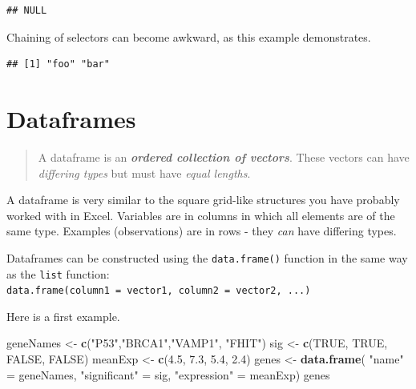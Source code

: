 \documentclass[]{book}
\newenvironment{Shaded}{\begin{snugshade}}{\end{snugshade}}
\newcommand{\CommentTok}[1]{\textcolor[rgb]{0.56,0.35,0.01}{\textit{#1}}}
\newcommand{\DecValTok}[1]{\textcolor[rgb]{0.00,0.00,0.81}{#1}}
\newcommand{\FloatTok}[1]{\textcolor[rgb]{0.00,0.00,0.81}{#1}}
\newcommand{\KeywordTok}[1]{\textcolor[rgb]{0.13,0.29,0.53}{\textbf{#1}}}
\newcommand{\NormalTok}[1]{#1}
\newcommand{\OperatorTok}[1]{\textcolor[rgb]{0.81,0.36,0.00}{\textbf{#1}}}
\newcommand{\OtherTok}[1]{\textcolor[rgb]{0.56,0.35,0.01}{#1}}
\newcommand{\StringTok}[1]{\textcolor[rgb]{0.31,0.60,0.02}{#1}}
\begin{document}
\begin{verbatim}
## NULL
\end{verbatim}

Chaining of selectors can become awkward, as this example demonstrates.

\begin{Shaded}
\end{Shaded}

\begin{verbatim}
## [1] "foo" "bar"
\end{verbatim}

\hypertarget{dataframes}{%
\section{Dataframes}\label{dataframes}}

\begin{quote}
A dataframe is an \textbf{\emph{ordered collection of vectors}}. These vectors can have \emph{differing types} but must have \emph{equal lengths}.
\end{quote}

A dataframe is very similar to the square grid-like structures you have probably worked with in Excel. Variables are in columns in which all elements are of the same type. Examples (observations) are in rows - they \emph{can} have differing types.

Dataframes can be constructed using the \texttt{data.frame()} function in the same way as the \texttt{list} function:\\
\texttt{data.frame(column1\ =\ vector1,\ column2\ =\ vector2,\ ...)}

Here is a first example.

\begin{Shaded}
\begin{Highlighting}[]
\NormalTok{geneNames <-}\StringTok{ }\KeywordTok{c}\NormalTok{(}\StringTok{"P53"}\NormalTok{,}\StringTok{"BRCA1"}\NormalTok{,}\StringTok{"VAMP1"}\NormalTok{, }\StringTok{"FHIT"}\NormalTok{)}
\NormalTok{sig <-}\StringTok{ }\KeywordTok{c}\NormalTok{(}\OtherTok{TRUE}\NormalTok{, }\OtherTok{TRUE}\NormalTok{, }\OtherTok{FALSE}\NormalTok{, }\OtherTok{FALSE}\NormalTok{)}
\NormalTok{meanExp <-}\StringTok{ }\KeywordTok{c}\NormalTok{(}\FloatTok{4.5}\NormalTok{, }\FloatTok{7.3}\NormalTok{, }\FloatTok{5.4}\NormalTok{, }\FloatTok{2.4}\NormalTok{)}
\NormalTok{genes <-}\StringTok{ }\KeywordTok{data.frame}\NormalTok{(}
    \StringTok{"name"}\NormalTok{ =}\StringTok{ }\NormalTok{geneNames,  }
    \StringTok{"significant"}\NormalTok{ =}\StringTok{ }\NormalTok{sig,  }
    \StringTok{"expression"}\NormalTok{ =}\StringTok{ }\NormalTok{meanExp)  }
\NormalTok{genes}
\end{Highlighting}
\end{Shaded}
\end{document}
